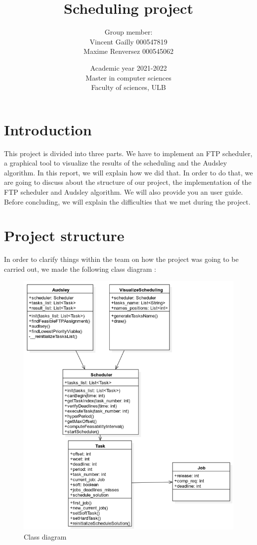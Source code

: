 \documentclass[a4paper,12pt]{article}
\title{
{\Huge Scheduling project}\\
\smallskip
}
\author{
Group member:\\
Vincent Gailly 000547819\\
Maxime Renversez 000545062
\smallskip
}
\date{ Academic year 2021-2022\\
Master in computer sciences \\
\vspace{1cm}
Faculty of sciences, ULB}
\begin{document}
\maketitle
\newpage
\tableofcontents
\newpage

\section{Introduction}

This project is divided into three parts. We have to implement an FTP scheduler, a graphical tool to visualize the results of the scheduling and the Audsley algorithm. In this report, we will explain how we did that. In order to do that, we are going to discuss about the structure of our project, the implementation of the FTP scheduler and Audsley algorithm. We will also provide you an user guide. Before concluding, we will explain the difficulties that we met during the project.      

\newpage

\section{Project structure}
In order to clarify things within the team on how the project was going to be carried out, we made the following class diagram :

\begin{figure}[h!]
  \centering
  \includegraphics[width=1\textwidth]{Resources_tex/Pictures/audsley.png}
  \caption{Class diagram}
  \label{fig: Project_structure}
\end{figure}
\end{document}
